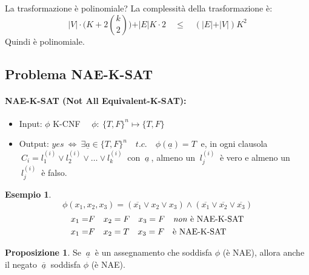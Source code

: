 \documentclass[a4paper]{article}
\theoremstyle{definition}
\newtheorem{esempio}{Esempio}[subsection]
\newtheorem{prop}{Proposizione}[subsection]
\begin{document}
	 	La trasformazione è polinomiale? La complessità della trasformazione è:
	 	\[
		 	\vert V \vert \cdot \Big(K + 2 \binom{k}{2}\Big) + \vert E \vert K\cdot 2 \quad \leq\quad
		 	(\vert E \vert + \vert V \vert) K^2
	 	\]
		Quindi è polinomiale.
	 	
	 \subsection{Problema NAE-K-SAT}
		 \paragraph{NAE-K-SAT (Not All Equivalent-K-SAT):} 
		 \begin{itemize}
		 	\item Input: $ \phi $ K-CNF $ \quad \phi:\ \{T,F\}^n \mapsto \{T,F\} $
		 	\item Output: $ yes \ \Leftrightarrow \ \exists \underline{a} \in \{T,F\}^n \quad t.c.\quad \phi(\underline{a}) = T \ $ e, in ogni clausola $ \ C_i = l^{(i)}_1 \vee l^{(i)}_2 \vee \dots \vee l^{(i)}_k \ $ con $ \ \underline{a} \ $, almeno un $ \ l^{(i)}_j \ $ è vero e almeno un $ \ l^{(i)}_j \ $ è falso.
 		 \end{itemize}
 		 
 		 \begin{esempio}
 		 	\[
	 		 	\phi(x_1, x_2, x_3) = (\overline{x_1} \vee x_2 \vee x_3) \wedge (\overline{x_1} \vee \overline{x_2} \vee \overline{x_3})
 		 	\]
		 	\begin{align*}
	 		 	x_1 =& F \quad x_2 = F \quad x_3 = F \quad \text{\textit{non} è NAE-K-SAT}\\
	 		 	x_1 =& F \quad x_2 = T \quad x_3 = F \quad \text{è NAE-K-SAT}\\
			\end{align*}
		\end{esempio}
 		 
		\begin{prop}
			Se $ \ \underline{a} \ $ è un assegnamento che soddisfa $ \phi $ (è NAE), allora anche il negato $ \ \overline{\underline{a}} \ $ soddisfa  $ \phi $ (è NAE).
		\end{prop}
 		 
\end{document}
